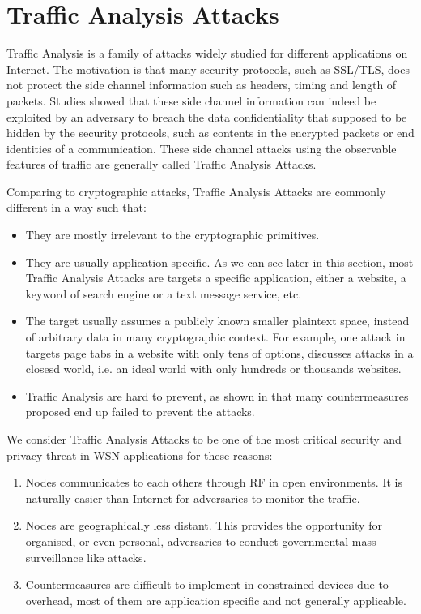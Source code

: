 
\section{Traffic Analysis Attacks}

Traffic Analysis is a family of attacks widely studied for different applications on Internet. The motivation is that many security protocols, such as SSL/TLS, does not protect the side channel information such as headers, timing and length of packets. Studies\cite{WebSideChannel}\cite{PinpointWeb}\cite{Peekaboo} showed that these side channel information can indeed be exploited by an adversary to breach the data confidentiality that supposed to be hidden by the security protocols, such as contents in the encrypted packets or end identities of a communication. These side channel attacks using the observable features of traffic are generally called Traffic Analysis Attacks.

Comparing to cryptographic attacks, Traffic Analysis Attacks are commonly different in a way such that:
\begin{itemize}
	\item They are mostly irrelevant to the cryptographic primitives. 
	\item They are usually application specific. As we can see later in this section, most Traffic Analysis Attacks are targets a specific application, either a website, a keyword of search engine or a text message service, etc.
	\item The target usually assumes a publicly known smaller plaintext space, instead of arbitrary data in many cryptographic context. For example, one attack in \cite{WebSideChannel} targets page tabs in a website with only tens of options,  \cite{Peekaboo} discusses attacks in a closesd world, i.e. an ideal world with only hundreds or thousands websites.
	\item Traffic Analysis are hard to prevent, as shown in \cite{Peekaboo} that many countermeasures proposed end up failed to prevent the attacks.
\end{itemize}

We consider Traffic Analysis Attacks to be one of the most critical security and privacy threat in WSN applications for these reasons:
\begin{enumerate}
	\item Nodes communicates to each others through RF in open environments. It is naturally easier than Internet for adversaries to monitor the traffic.
	\item Nodes are geographically less distant. This provides the opportunity for organised, or even personal, adversaries to conduct governmental mass surveillance like attacks.
	\item Countermeasures are difficult to implement in constrained devices due to overhead, most of them are application specific and not generally applicable.
\end{enumerate} 

